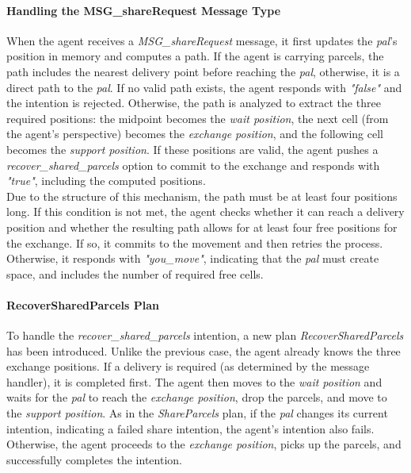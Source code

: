                 
                \paragraph{Handling the MSG\_shareRequest Message Type}
                    When the agent receives a \textit{MSG\_shareRequest} message, it first updates the \textit{pal}'s position in memory and computes a path. If the agent is carrying parcels, the path includes the nearest delivery point before reaching the \textit{pal}, otherwise, it is a direct path to the \textit{pal}. If no valid path exists, the agent responds with \textit{"false"} and the intention is rejected. Otherwise, the path is analyzed to extract the three required positions: the midpoint becomes the \textit{wait position}, the next cell (from the agent's perspective) becomes the \textit{exchange position}, and the following cell becomes the \textit{support position}. If these positions are valid, the agent pushes a \textit{recover\_shared\_parcels} option to commit to the exchange and responds with \textit{"true"}, including the computed positions.
                    \medskip\\
                    Due to the structure of this mechanism, the path must be at least four positions long. If this condition is not met, the agent checks whether it can reach a delivery position and whether the resulting path allows for at least four free positions for the exchange. If so, it commits to the movement and then retries the process. Otherwise, it responds with \textit{"you\_move"}, indicating that the \textit{pal} must create space, and includes the number of required free cells.
                    
                \paragraph{RecoverSharedParcels Plan}
                    To handle the \textit{recover\_shared\_parcels} intention, a new plan \textit{RecoverSharedParcels} has been introduced. Unlike the previous case, the agent already knows the three exchange positions. If a delivery is required (as determined by the message handler), it is completed first. The agent then moves to the \textit{wait position} and waits for the \textit{pal} to reach the \textit{exchange position}, drop the parcels, and move to the \textit{support position}. As in the \textit{ShareParcels} plan, if the \textit{pal} changes its current intention, indicating a failed share intention, the agent's intention also fails. Otherwise, the agent proceeds to the \textit{exchange position}, picks up the parcels, and successfully completes the intention.

